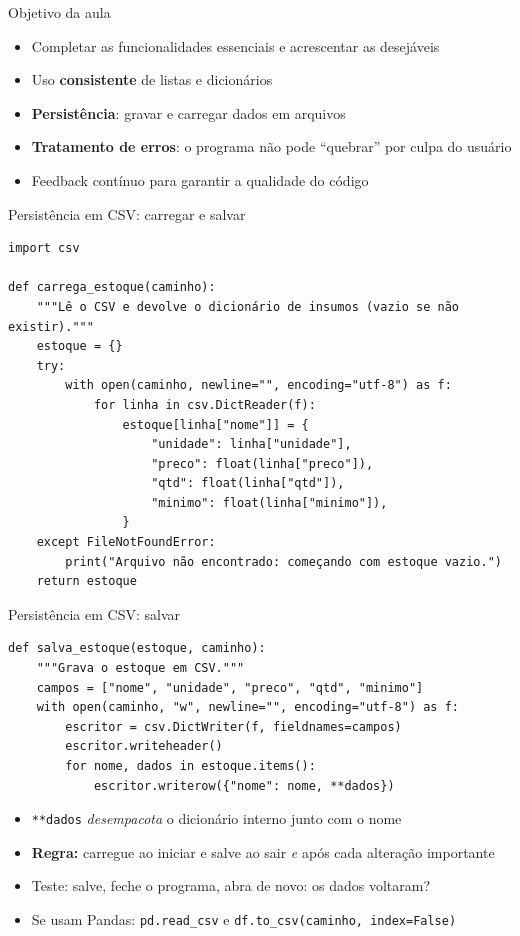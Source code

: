\documentclass[aspectratio=169,10pt,t]{beamer}
\begin{document}
\capa

\begin{frame}{Objetivo da aula}
  \begin{itemize}
    \item Completar as funcionalidades essenciais e acrescentar as desejáveis
    \item Uso \textbf{consistente} de listas e dicionários
    \item \textbf{Persistência}: gravar e carregar dados em arquivos
    \item \textbf{Tratamento de erros}: o programa não pode ``quebrar'' por culpa do usuário
    \item Feedback contínuo para garantir a qualidade do código
  \end{itemize}
\end{frame}

\begin{frame}[fragile]{Persistência em CSV: carregar e salvar}
\begin{lstlisting}[basicstyle=\ttfamily\scriptsize]
import csv

def carrega_estoque(caminho):
    """Lê o CSV e devolve o dicionário de insumos (vazio se não existir)."""
    estoque = {}
    try:
        with open(caminho, newline="", encoding="utf-8") as f:
            for linha in csv.DictReader(f):
                estoque[linha["nome"]] = {
                    "unidade": linha["unidade"],
                    "preco": float(linha["preco"]),
                    "qtd": float(linha["qtd"]),
                    "minimo": float(linha["minimo"]),
                }
    except FileNotFoundError:
        print("Arquivo não encontrado: começando com estoque vazio.")
    return estoque
\end{lstlisting}
\end{frame}

\begin{frame}[fragile]{Persistência em CSV: salvar}
\begin{lstlisting}
def salva_estoque(estoque, caminho):
    """Grava o estoque em CSV."""
    campos = ["nome", "unidade", "preco", "qtd", "minimo"]
    with open(caminho, "w", newline="", encoding="utf-8") as f:
        escritor = csv.DictWriter(f, fieldnames=campos)
        escritor.writeheader()
        for nome, dados in estoque.items():
            escritor.writerow({"nome": nome, **dados})
\end{lstlisting}
  \begin{itemize}
    \item \texttt{**dados} \emph{desempacota} o dicionário interno junto com o nome
    \item \textbf{Regra:} carregue ao iniciar e salve ao sair \emph{e} após cada alteração importante
    \item Teste: salve, feche o programa, abra de novo: os dados voltaram?
    \item Se usam Pandas: \texttt{pd.read\_csv} e \texttt{df.to\_csv(caminho, index=False)}
  \end{itemize}
\end{frame}
\end{document}

